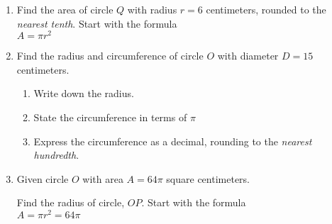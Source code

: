 \documentclass[12pt, twoside]{article}
\begin{document}
\begin{enumerate}
\newpage
\item Find the area of circle $Q$ with radius $r=6$ centimeters, rounded to the \emph{nearest tenth}.
  Start with the formula\\[0.5cm]
  $A = \pi r^2$ 
    \begin{flushright}
    \end{flushright}

\newpage
\item Find the radius and circumference of circle $O$ with diameter $D=15$ centimeters.
  \begin{multicols}{2}
  \raggedcolumns
  \begin{enumerate}
    \item Write down the radius. \vspace{1.2cm}
    \item State the circumference in terms of $\pi$ \vspace{1cm}
    \item Express the circumference as a decimal, rounding to the \emph{nearest hundredth}.
  \end{enumerate}
  \columnbreak
  \end{multicols}

\newpage
\item Given circle $O$ with area $A=64 \pi$ square centimeters.
  \begin{multicols}{2}
  \raggedcolumns
  Find the radius of circle, $OP$. Start with the formula\\[0.5cm]
  $A = \pi r^2 = 64 \pi$ \vspace{1.7cm}

  \end{multicols}
  

\end{enumerate}
\end{document}
